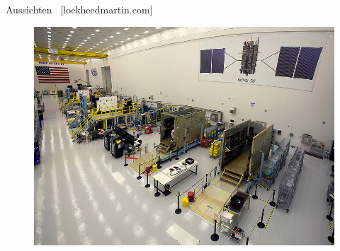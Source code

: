 \begin{frame}{Aussichten}
    ~{\small [lockheedmartin.com]}
    \begin{figure}
        \centering
        \includegraphics[height=0.8\textheight]{images/gps-3-construction.jpg}
    \end{figure}
\end{frame}
